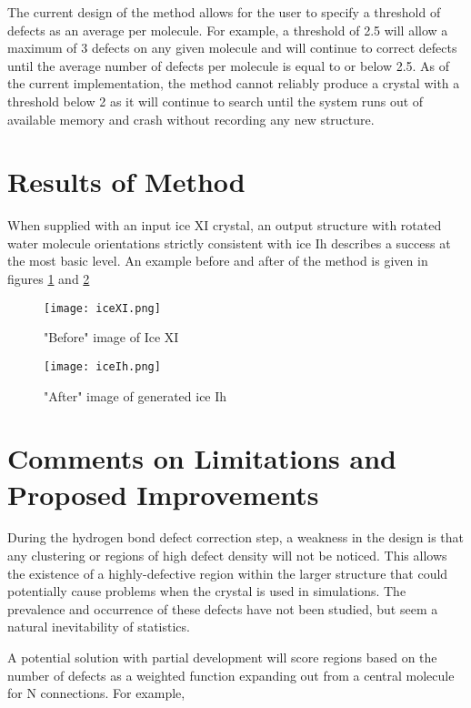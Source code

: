 The current design of the method allows for the user to specify a threshold of defects as an average per molecule. 
For example, a threshold of 2.5 will allow a maximum of 3 defects on any given molecule and will continue to correct defects until the average number of defects per molecule is equal to or below 2.5.
As of the current implementation, the method cannot reliably produce a crystal with a threshold below 2 as it will continue to search until the system runs out of available memory and crash without recording any new structure.



\section{Results of Method}

When supplied with an input ice XI crystal, an output structure with rotated water molecule orientations strictly consistent with ice Ih describes a success at the most basic level.
An example before and after of the method is given in figures \ref{fig:iceXI} and \ref{fig:iceIh}

\begin{figure}
	
	\centering
	
	\texttt{[image: iceXI.png]}
	
	\caption{"Before" image of Ice XI}
	
	\label{fig:iceXI}
	
\end{figure}

\begin{figure}
	
	\centering
	
	\texttt{[image: iceIh.png]}
	
	\caption{"After" image of generated ice Ih}
	
	\label{fig:iceIh}
	
\end{figure}

\section{Comments on Limitations and Proposed Improvements}

During the hydrogen bond defect correction step, a weakness in the design is that any clustering or regions of high defect density will not be noticed.
This allows the existence of a highly-defective region within the larger structure that could potentially cause problems when the crystal is used in simulations. 
The prevalence and occurrence of these defects have not been studied, but seem a natural inevitability of statistics. 

A potential solution with partial development will score regions based on the number of defects as a weighted function expanding out from a central molecule for N connections. 
For example, 












